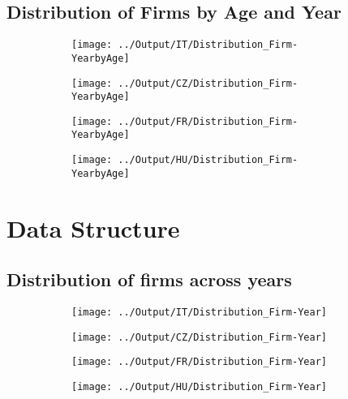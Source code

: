 \documentclass[12pt,notitlepage]{article}
\begin{document}
\subsection{Distribution of Firms by Age and Year}
\begin{figure}[!htpb]
\centering
\caption{Firm age and Assets}
\begin{subfigure}{.49\textwidth}
    \centering
 \texttt{[image: ../Output/IT/Distribution\_Firm-YearbyAge]}
\end{subfigure}
\begin{subfigure}{.49\textwidth}
    \centering
 \texttt{[image: ../Output/CZ/Distribution\_Firm-YearbyAge]}
\end{subfigure}
\begin{subfigure}{.49\textwidth}
    \centering
 \texttt{[image: ../Output/FR/Distribution\_Firm-YearbyAge]}
\end{subfigure}%
\begin{subfigure}{.49\textwidth}
    \centering
 \texttt{[image: ../Output/HU/Distribution\_Firm-YearbyAge]}
\end{subfigure}
\end{figure}
\pagebreak



\FloatBarrier
\section{Data Structure} %
\label{sec:data_structure}
\FloatBarrier



\subsection{Distribution of firms across years}

\begin{figure}[!htpb]
\centering
\caption{Distribution of firms across years}
\begin{subfigure}{.49\textwidth}
    \centering
 \texttt{[image: ../Output/IT/Distribution\_Firm-Year]}
\end{subfigure}%
\begin{subfigure}{.49\textwidth}
    \centering
 \texttt{[image: ../Output/CZ/Distribution\_Firm-Year]}
\end{subfigure}
\begin{subfigure}{.49\textwidth}
    \centering
 \texttt{[image: ../Output/FR/Distribution\_Firm-Year]}
\end{subfigure}%
\begin{subfigure}{.49\textwidth}
    \centering
 \texttt{[image: ../Output/HU/Distribution\_Firm-Year]}
\end{subfigure}
\end{figure}
\pagebreak
\end{document}
